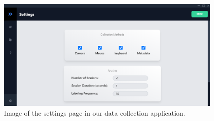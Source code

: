 \documentclass[../main.tex]{subfiles}
\begin{document}
\begin{figure}[htp]
    \centering
    \includegraphics[width=14cm]{figures/ui_settings}   
    \caption{Image of the settings page in our data collection application.}
    \label{fig:ui_settings} 
\end{figure}
\end{document}
